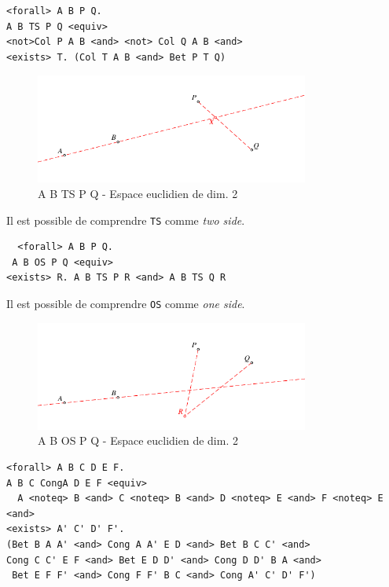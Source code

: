 \documentclass[8pt,a4paper]{article}
\theoremstyle{plain}
\begin{document}
\begin{tcolorbox}
\begin{verbatim}
<forall> A B P Q.
A B TS P Q <equiv>
<not>Col P A B <and> <not> Col Q A B <and>
<exists> T. (Col T A B <and> Bet P T Q)
\end{verbatim}
\end{tcolorbox}

    \begin{figure}[H] %
  \centering
    \includegraphics[width=90mm]{fig07.pdf}
\caption{A B TS P Q - Espace euclidien de dim. 2\label{TS1}}
\end{figure}


Il est possible de comprendre \verb+TS+ comme \textit{two side}.
\begin{tcolorbox}
\begin{verbatim}
  <forall> A B P Q.
 A B OS P Q <equiv>
<exists> R. A B TS P R <and> A B TS Q R
\end{verbatim}
\end{tcolorbox}
Il est possible de comprendre \verb+OS+ comme \textit{one side}.

    \begin{figure}[H] %
  \centering
    \includegraphics[width=90mm]{fig08.pdf}
\caption{A B OS P Q - Espace euclidien de dim. 2\label{OS1}}
\end{figure}


\begin{tcolorbox}
\begin{verbatim}
<forall> A B C D E F.
A B C CongA D E F <equiv>
  A <noteq> B <and> C <noteq> B <and> D <noteq> E <and> F <noteq> E <and>
<exists> A' C' D' F'.
(Bet B A A' <and> Cong A A' E D <and> Bet B C C' <and> 
Cong C C' E F <and> Bet E D D' <and> Cong D D' B A <and>
 Bet E F F' <and> Cong F F' B C <and> Cong A' C' D' F')
\end{verbatim}
\end{tcolorbox}
\end{document}
